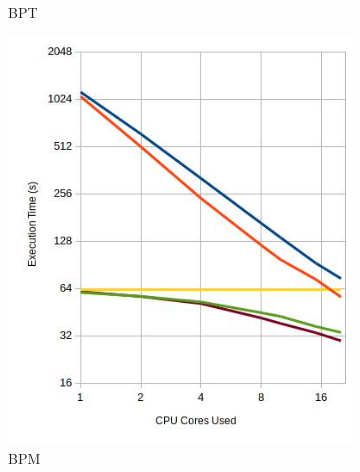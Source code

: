 \begin{figure}[H]
\begin{subfigure}[h]{0.45\textwidth}
\caption{\label{img:bptTexec} BPT}
\end{subfigure}


\begin{subfigure}[h]{0.45\textwidth}
\includegraphics[width=\textwidth]{img/bpmTexec.jpg}
\caption{\label{img:bpmTexec} BPM}
\end{subfigure}
~
\begin{subfigure}[h]{0.45\textwidth}

\end{subfigure}
\end{figure}
